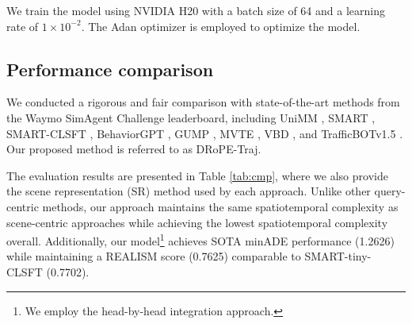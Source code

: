 \documentclass[lettersize,journal]{IEEEtran}
\theoremstyle{definition}
\begin{document}
We train the model using NVIDIA H20 with a batch size of 64 and a learning rate of $1 \times 10^{-2}$. The Adan \cite{xie2024adan} optimizer is employed to optimize the model.



\subsection{Performance comparison}
\label{sec:performance_cmp}

We conducted a rigorous and fair comparison with state-of-the-art methods from the Waymo SimAgent Challenge leaderboard, including UniMM \cite{lin2025revisit}, SMART \cite{wu2024smart}, SMART-CLSFT \cite{zhang2025closed}, BehaviorGPT \cite{zhou2024behaviorgpt}, GUMP \cite{hu2024solving}, MVTE \cite{wang2023multiverse}, VBD \cite{huang2024versatile}, and TrafficBOTv1.5 \cite{zhang2024trafficbots}. Our proposed method is referred to as DRoPE-Traj.

The evaluation results are presented in Table \ref{tab:cmp}, where we also provide the scene representation (SR) method used by each approach. Unlike other query-centric methods, our approach maintains the same spatiotemporal complexity as scene-centric approaches while achieving the lowest spatiotemporal complexity overall. Additionally, our model\footnote{We employ the head-by-head integration approach.} achieves SOTA minADE performance (1.2626) while maintaining a REALISM score (0.7625) comparable to SMART-tiny-CLSFT (0.7702).
\end{document}

